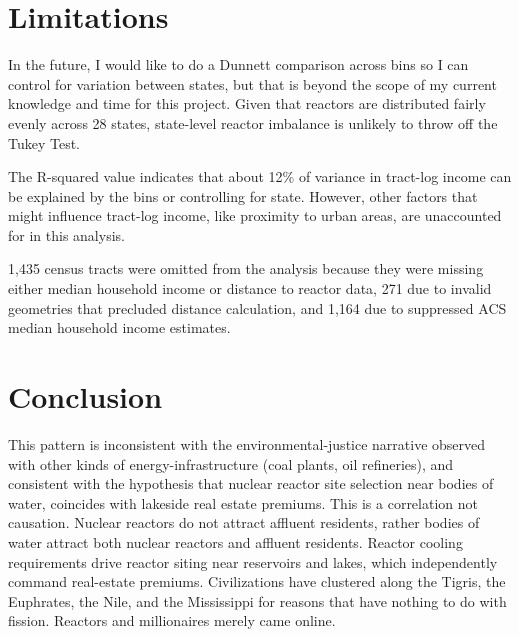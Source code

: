 \documentclass[
]{article}
\begin{document}
\section{Limitations}\label{limitations}

In the future, I would like to do a Dunnett comparison across bins so I
can control for variation between states, but that is beyond the scope
of my current knowledge and time for this project. Given that reactors
are distributed fairly evenly across 28 states, state-level reactor
imbalance is unlikely to throw off the Tukey Test.

The R-squared value indicates that about 12\% of variance in tract-log
income can be explained by the bins or controlling for state. However,
other factors that might influence tract-log income, like proximity to
urban areas, are unaccounted for in this analysis.

1,435 census tracts were omitted from the analysis because they were
missing either median household income or distance to reactor data, 271
due to invalid geometries that precluded distance calculation, and 1,164
due to suppressed ACS median household income estimates.

\section{Conclusion}\label{conclusion}

This pattern is inconsistent with the environmental-justice narrative
observed with other kinds of energy-infrastructure (coal plants, oil
refineries), and consistent with the hypothesis that nuclear reactor
site selection near bodies of water, coincides with lakeside real estate
premiums. This is a correlation not causation. Nuclear reactors do not
attract affluent residents, rather bodies of water attract both nuclear
reactors and affluent residents. Reactor cooling requirements drive
reactor siting near reservoirs and lakes, which independently command
real-estate premiums. Civilizations have clustered along the Tigris, the
Euphrates, the Nile, and the Mississippi for reasons that have nothing
to do with fission. Reactors and millionaires merely came online.
\end{document}
